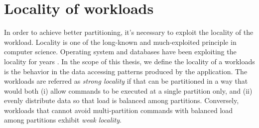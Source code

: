 \section{Locality of workloads}

\label{sysmodel:locality}
In order to achieve better partitioning, it's necessary to exploit the locality
of the workload. Locality is one of the long-known and much-exploited principle in
computer science. Operating system and databases have been exploiting the
locality for years \cite{locality:os}. In the scope of this thesis, we define
the locality of a workloads is the behavior in the data accessing patterns
produced by the application. The workloads are referred as \emph{strong
locality} if that can be partitioned in a way that would both (i) allow commands
to be executed at a single partition only, and (ii) evenly distribute data so
that load is balanced among partitions. Conversely, workloads that cannot avoid
multi-partition commands with balanced load among partitions exhibit \emph{weak
locality}.
